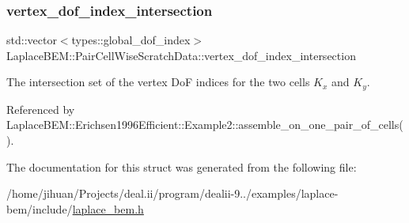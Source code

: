 \subsubsection{\texorpdfstring{vertex\+\_\+dof\+\_\+index\+\_\+intersection}{vertex\_dof\_index\_intersection}}
{\footnotesize\ttfamily std\+::vector$<$types\+::global\+\_\+dof\+\_\+index$>$ Laplace\+B\+E\+M\+::\+Pair\+Cell\+Wise\+Scratch\+Data\+::vertex\+\_\+dof\+\_\+index\+\_\+intersection}

The intersection set of the vertex DoF indices for the two cells $K_x$ and $K_y$. 

Referenced by Laplace\+B\+E\+M\+::\+Erichsen1996\+Efficient\+::\+Example2\+::assemble\+\_\+on\+\_\+one\+\_\+pair\+\_\+of\+\_\+cells().



The documentation for this struct was generated from the following file\+:\begin{DoxyCompactItemize}
\item 
/home/jihuan/\+Projects/deal.\+ii/program/dealii-\/9../examples/laplace-\/bem/include/\hyperlink{laplace__bem_8h}{laplace\+\_\+bem.\+h}\end{DoxyCompactItemize}
